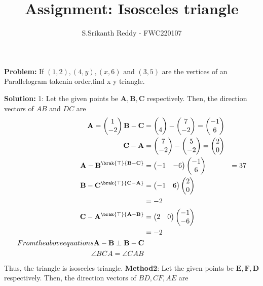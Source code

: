 \documentclass{article}
\newcommand{\myvec}[1]{\ensuremath{\begin{pmatrix}#1\end{pmatrix}}}
\let\vec\mathbf
\newcommand{\Problem}{\noindent \textbf{Problem: }}
\newcommand{\solution}{\noindent \textbf{Solution: }}
\begin{document}
\title{Assignment: Isosceles triangle}
\author{\Large S.Srikanth Reddy - FWC220107}
\date{}
\maketitle
\Problem If $(1,2),(4,y),(x,6) \text{ and } (3,5)$ are the vertices of an Parallelogram takenin order,find x  y triangle.
\begin{table}[h!]
	\small
	\centering
     
	\label{table:12table1}
	\end{table}
\solution 1:
Let the given points be $\vec{A}, \vec{B}, \vec{C}$ respectively. 
Then, the direction vectors of $AB$ and $DC$ are
\begin{align}
\vec{A}=\myvec{1 \\ -2}
\vec{B}-\vec{C}&=\myvec{\\4}-\myvec{7\\-2}=\myvec{-1\\6}\\
\vec{C}-\vec{A}&=\myvec{7\\-2}-\myvec{5\\-2}=\myvec{2\\0}\\
{\vec{A}-\vec{B}}^\brak{\top}{\vec{B}-\vec{C}}&=\myvec{-1 & -6}\myvec{-1 \\ 6}\
&=37\\
{\vec{B}-\vec{C}}^\brak{\top}{\vec{C}-\vec{A}}&=\myvec{-1 & 6}\myvec{2 \\ 0}\\
&=-2\\
{\vec{C}-\vec{A}}^\brak{\top}{\vec{A}-\vec{B}}&=\myvec{2 & 0}\myvec{-1 \\ -6}\\
&=-2\\
From  the above equations
{\vec{A} -\vec{B}}\perp {\vec{B} -\vec{C}}\\
\angle BCA = \angle CAB 
\end{align}
Thus, the triangle is isosceles triangle.
\textbf{Method2}: Let the given points be $\vec{E}, \vec{F}, \vec{D}$ respectively. 
 Then, the direction vectors of  $BD ,CF,AE$ are
\end{document}
